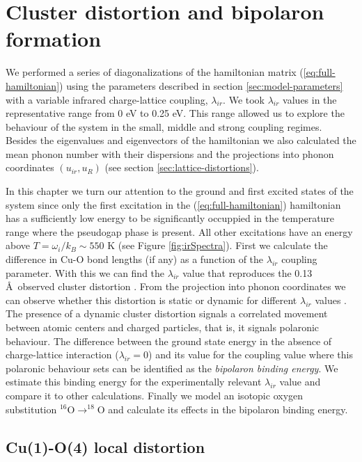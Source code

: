 \chapter{Cluster distortion and bipolaron formation}
\label{chap:ground}

We performed a series of diagonalizations of the hamiltonian matrix (\ref{eq:full-hamiltonian}) using the parameters described in section \ref{sec:model-parameters} with a variable infrared charge-lattice coupling, $\lambda_{ir}$. 
We took $\lambda_{ir}$ values in the representative range from 0 eV to 0.25 eV. 
This range allowed us to explore the behaviour of the system in the small, middle and strong coupling regimes. 
Besides the eigenvalues and eigenvectors of the hamiltonian we also calculated the mean phonon number with their dispersions and the projections into phonon coordinates $(u_{ir}, u_R)$ (see section \ref{sec:lattice-distortions}).

In this chapter we turn our attention to the ground and first excited states of the system since only the first excitation in the (\ref{eq:full-hamiltonian}) hamiltonian has a sufficiently low energy to be significantly occuppied in the temperature range where the pseudogap phase is present.
All other excitations have an energy above $T=\omega_i/k_B \sim 550$ K (see Figure \ref{fig:irSpectra}).
First we calculate the difference in Cu-O bond lengths (if any) as a function of the $\lambda_{ir}$ coupling parameter.
With this we can find the $\lambda_{ir}$ value that reproduces the 0.13 \AA\ observed cluster distortion \cite{MustredeLeon1990}.
From the projection into phonon coordinates we can observe whether this distortion is static or dynamic for different $\lambda_{ir}$ values \cite{MustredeLeon1992}.
The presence of a dynamic cluster distortion signals a correlated movement between atomic centers and charged particles, that is, it signals polaronic behaviour.
The difference between the ground state energy in the absence of charge-lattice interaction ($\lambda_{ir}=0$) and its value for the coupling value where this polaronic behaviour sets can be identified as the \textit{bipolaron binding energy}.
We estimate this binding energy for the experimentally relevant $\lambda_{ir}$ value and compare it to other calculations.
Finally we model an isotopic oxygen substitution $^{16}$O$\rightarrow ^{18}$O and calculate its effects in the bipolaron binding energy.

\section{Cu(1)-O(4) local distortion}
\label{sec:grd-phonon-proj}

